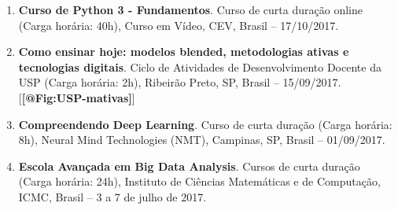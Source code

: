 \documentclass[
  brazilian,
  11pt,
  a4paper,
]{article}
\begin{document}
\begin{enumerate}
  Seminário (Carga horária: 1,5h), Instituto de Química de São Carlos
  (USP-IQSC), São Carlos, SP, Brasil -- 12/06/2019.
\item
  \textbf{Curso de Python 3 - Fundamentos}. Curso de curta duração
  online (Carga horária: 40h), Curso em Vídeo, CEV, Brasil --
  17/10/2017.
\item
  \textbf{Como ensinar hoje: modelos blended, metodologias ativas e
  tecnologias digitais}. Ciclo de Atividades de Desenvolvimento Docente
  da USP (Carga horária: 2h), Ribeirão Preto, SP, Brasil -- 15/09/2017.
  {[}\textbf{{[}@Fig:USP-mativas{]}}{]}
\item
  \textbf{Compreendendo Deep Learning}. Curso de curta duração (Carga
  horária: 8h), Neural Mind Technologies (NMT), Campinas, SP, Brasil --
  01/09/2017.
\item
  \textbf{Escola Avançada em Big Data Analysis}. Cursos de curta duração
  (Carga horária: 24h), Instituto de Ciências Matemáticas e de
  Computação, ICMC, Brasil -- 3 a 7 de julho de 2017.


\end{enumerate}
\end{document}

